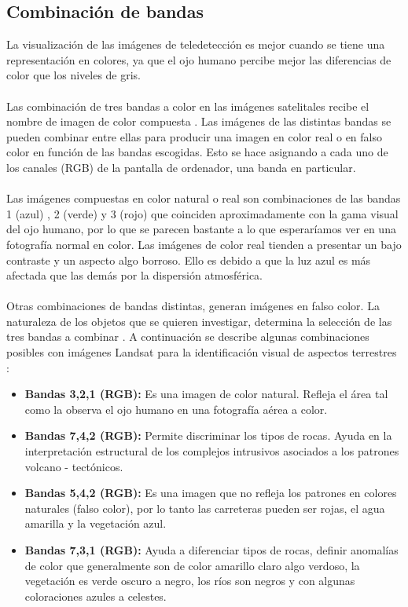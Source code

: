 \subsection{Combinaci\'on de bandas}
La visualizaci\'on de las im\'agenes de teledetecci\'on es mejor cuando se tiene una representaci\'on en colores, ya que el ojo humano percibe mejor las diferencias de color que los niveles de gris.\\~\\
Las combinaci\'on de tres bandas a color en las im\'agenes satelitales recibe el nombre de imagen de color compuesta \cite{com2015color}. Las im\'agenes de las distintas bandas se pueden combinar entre ellas para producir una imagen en color real o en falso color en funci\'on de las bandas escogidas. Esto se hace asignando a cada uno de los canales (RGB) de la pantalla de ordenador, una banda en particular.\\~\\
Las im\'agenes compuestas en color natural o real son combinaciones de las bandas 1 (azul) , 2 (verde) y 3 (rojo) que coinciden aproximadamente con la gama visual del ojo humano, por lo que se parecen bastante a lo que esperar\'iamos ver en una fotograf\'ia normal en color. Las im\'agenes de color real tienden a presentar un bajo contraste y un aspecto algo borroso. Ello es debido a que la luz azul es m\'as afectada que las dem\'as por la dispersión atmosf\'erica.\\~\\
Otras combinaciones de bandas distintas, generan im\'agenes en falso color. La naturaleza de los objetos que se quieren investigar, determina la selecci\'on de las tres bandas a combinar \cite{com2015color}. A continuaci\'on se describe algunas combinaciones posibles con im\'agenes Landsat para la identificaci\'on visual de aspectos terrestres \cite{lillesand2014remote}:
	\begin{itemize}
		\item \textbf{Bandas 3,2,1 (RGB):} Es una imagen de color natural. Refleja el \'area tal como la observa el ojo humano en una fotograf\'ia a\'erea a color.
		\item  \textbf{Bandas 7,4,2 (RGB):} Permite discriminar los tipos de rocas. Ayuda en la interpretaci\'on estructural de los complejos intrusivos asociados a los patrones volcano - tect\'onicos.
		\item  \textbf{Bandas 5,4,2 (RGB):} Es una imagen que no refleja los patrones en colores naturales (falso color), por lo tanto las carreteras pueden ser rojas, el agua amarilla y la vegetaci\'on azul.
		\item \textbf{Bandas 7,3,1 (RGB):} Ayuda a diferenciar tipos de rocas, definir anomal\'ias de color que generalmente son de color amarillo claro algo verdoso, la vegetaci\'on es verde oscuro a negro, los r\'ios son negros y con algunas coloraciones azules a celestes.		
	\end{itemize}
